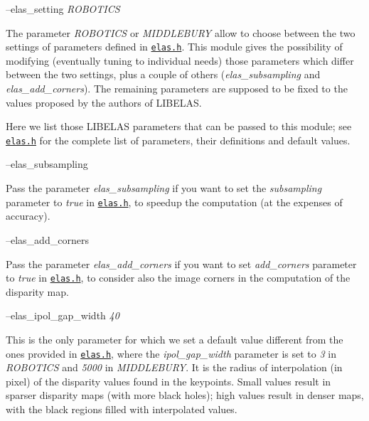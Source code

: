 --elas\+\_\+setting {\itshape R\+O\+B\+O\+T\+I\+CS} 
\begin{DoxyItemize}
\item The parameter {\itshape R\+O\+B\+O\+T\+I\+CS} or {\itshape M\+I\+D\+D\+L\+E\+B\+U\+RY} allow to choose between the two settings of parameters defined in \href{https://github.com/robotology/stereo-vision/tree/master/lib/elas/include/elas.h}{\tt elas.\+h}. This module gives the possibility of modifying (eventually tuning to individual needs) those parameters which differ between the two settings, plus a couple of others ({\itshape elas\+\_\+subsampling} and {\itshape elas\+\_\+add\+\_\+corners}). The remaining parameters are supposed to be fixed to the values proposed by the authors of L\+I\+B\+E\+L\+AS.
\end{DoxyItemize}

Here we list those L\+I\+B\+E\+L\+AS parameters that can be passed to this module; see \href{https://github.com/robotology/stereo-vision/tree/master/lib/elas/include/elas.h}{\tt elas.\+h} for the complete list of parameters, their definitions and default values.

--elas\+\_\+subsampling
\begin{DoxyItemize}
\item Pass the parameter {\itshape elas\+\_\+subsampling} if you want to set the {\itshape subsampling} parameter to {\itshape true} in \href{https://github.com/robotology/stereo-vision/tree/master/lib/elas/include/elas.h}{\tt elas.\+h}, to speedup the computation (at the expenses of accuracy).
\end{DoxyItemize}

--elas\+\_\+add\+\_\+corners
\begin{DoxyItemize}
\item Pass the parameter {\itshape elas\+\_\+add\+\_\+corners} if you want to set {\itshape add\+\_\+corners} parameter to {\itshape true} in \href{https://github.com/robotology/stereo-vision/tree/master/lib/elas/include/elas.h}{\tt elas.\+h}, to consider also the image corners in the computation of the disparity map.
\end{DoxyItemize}

--elas\+\_\+ipol\+\_\+gap\+\_\+width {\itshape 40} 
\begin{DoxyItemize}
\item This is the only parameter for which we set a default value different from the ones provided in \href{https://github.com/robotology/stereo-vision/tree/master/lib/elas/include/elas.h}{\tt elas.\+h}, where the {\itshape ipol\+\_\+gap\+\_\+width} parameter is set to {\itshape 3} in {\itshape R\+O\+B\+O\+T\+I\+CS} and {\itshape 5000} in {\itshape M\+I\+D\+D\+L\+E\+B\+U\+RY}. It is the radius of interpolation (in pixel) of the disparity values found in the keypoints. Small values result in sparser disparity maps (with more black holes); high values result in denser maps, with the black regions filled with interpolated values.
\end{DoxyItemize}

